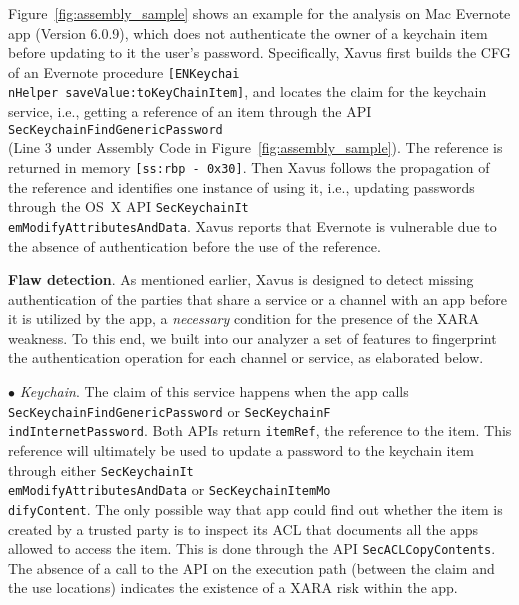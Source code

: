 \documentclass{article}
\begin{document}
Figure~\ref{fig:assembly_sample} shows an example for the analysis on Mac Evernote app (Version 6.0.9), which does not authenticate the owner of a keychain item before updating to it the user's password. Specifically, Xavus first builds the CFG of an Evernote procedure \texttt{[ENKeychai\\nHelper saveValue:toKeyChainItem]}, and locates the claim for the keychain service, i.e., getting a reference of an item through the API \texttt{SecKeychainFindGenericPassword}\\ (Line 3 under Assembly Code in Figure~\ref{fig:assembly_sample}). The reference is returned in memory \texttt{[ss:rbp - 0x30]}. Then Xavus follows the propagation of the reference and identifies one instance of using it, i.e., updating passwords through the OS~X API \texttt{SecKeychainIt\\emModifyAttributesAndData}. Xavus reports that Evernote is vulnerable due to the absence of authentication before the use of the reference.





\vspace {3pt}\noindent\textbf{Flaw detection}. As mentioned earlier, Xavus is designed to detect missing authentication of the parties that share a service or a channel with an app before it is utilized by the app, a \textit{necessary} condition for the presence of the XARA weakness. To this end, we built into our analyzer a set of features to fingerprint the authentication operation for each channel or service, as elaborated below.

\vspace {3pt}\noindent$\bullet$\textit{ Keychain}. The claim of this service happens when the app calls \texttt{SecKeychainFindGenericPassword} or \texttt{SecKeychainF\\indInternetPassword}. Both APIs return \texttt{itemRef}, the reference to the item.  This reference will ultimately be used to update a password to the keychain item through either \texttt{SecKeychainIt\\emModifyAttributesAndData} or \texttt{SecKeychainItemMo\\difyContent}. The only possible way that app could find out whether the item is created by a trusted party is to inspect its ACL that documents all the apps allowed to access the item. This is done through the API \texttt{SecACLCopyContents}.  The absence of a call to the API on the execution path (between the claim and the use locations) indicates the existence of a XARA risk within the app.
\end{document}
